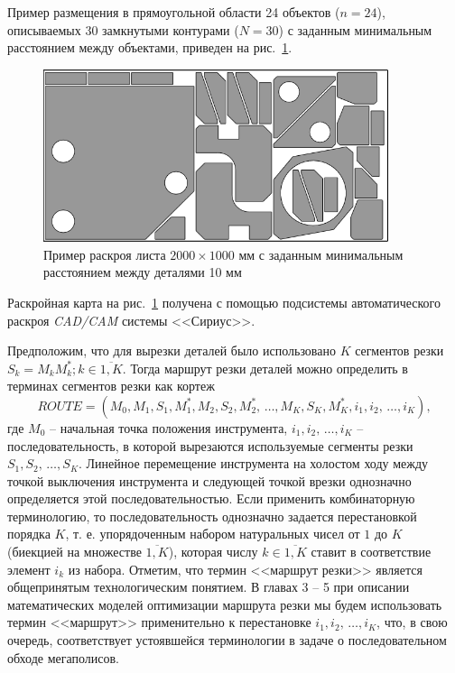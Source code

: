 \documentclass[11pt,twoside,openany]{report}
\begin{document}
Пример размещения в прямоугольной области 24 объектов
($n=24$),
описываемых 30 замкнутыми контурами
($N=30$)
с заданным минимальным расстоянием между объектами,
приведен на рис.~\ref{nesting}.

\begin{figure}[h]
  \begin{center}
  \includegraphics[width=0.9\textwidth]{nesting.png}
  \caption{Пример раскроя листа $2000 \times 1000$ мм с заданным минимальным расстоянием между деталями 10 мм}
  \label{nesting}
  \end{center}
\end{figure}

Раскройная карта
на рис.~\ref{nesting}
получена с помощью подсистемы автоматического раскроя
\textit{CAD/CAM}
системы <<Сириус>>.

Предположим, что для вырезки деталей было использовано
$K$
сегментов резки
$S_k=M_kM^*_k; k \in \overline{1,K}$.
Тогда маршрут резки деталей можно определить
в терминах сегментов резки как кортеж
\begin{equation}
  ROUTE = (
    M_0, M_1, S_1, M_1^*, M_2, S_2, M_2^*, \,\dots, M_K, S_K, M_K^*,
    i_1, i_2, \,\dots, i_K
  )
  ,
  \label{tuple}
\end{equation}
где
$M_0$
-- начальная точка положения инструмента,
$i_1, i_2, \,\dots, i_K$
– последовательность, в которой вырезаются используемые сегменты резки
$S_1, S_2, \,\dots, S_K$.
Линейное перемещение инструмента на холостом ходу
между точкой выключения инструмента и следующей точкой врезки
однозначно определяется этой последовательностью.
Если применить комбинаторную терминологию,
то последовательность однозначно задается перестановкой порядка
$K$,
т. е. упорядоченным набором натуральных чисел от $1$ до $K$
(биекцией на множестве $\overline{1,K}$),
которая числу
$k \in \overline{1,K}$
ставит в соответствие элемент
$i_k$ из набора.
Отметим, что термин <<маршрут резки>> является
общепринятым технологическим понятием.
В главах 3 -- 5 при описании математических моделей оптимизации
маршрута резки мы будем использовать термин <<маршрут>>
применительно к перестановке
$i_1, i_2, \,\dots, i_K$,
что, в свою очередь, соответствует устоявшейся
терминологии в задаче о последовательном обходе мегаполисов.
\end{document}
